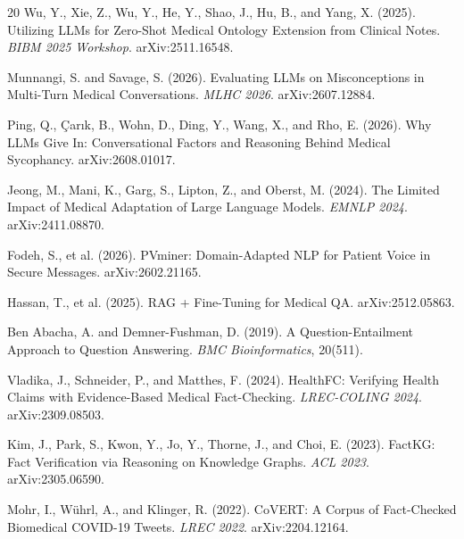 \documentclass[11pt,a4paper]{article}
\begin{document}
\begin{thebibliography}{20}
Wu, Y., Xie, Z., Wu, Y., He, Y., Shao, J., Hu, B., and Yang, X. (2025).
Utilizing LLMs for Zero-Shot Medical Ontology Extension from Clinical Notes.
\textit{BIBM 2025 Workshop}. arXiv:2511.16548.

Munnangi, S. and Savage, S. (2026).
Evaluating LLMs on Misconceptions in Multi-Turn Medical Conversations.
\textit{MLHC 2026}. arXiv:2607.12884.

Ping, Q., \c{C}ar{\i}k, B., Wohn, D., Ding, Y., Wang, X., and Rho, E. (2026).
Why LLMs Give In: Conversational Factors and Reasoning Behind Medical Sycophancy.
arXiv:2608.01017.

Jeong, M., Mani, K., Garg, S., Lipton, Z., and Oberst, M. (2024).
The Limited Impact of Medical Adaptation of Large Language Models.
\textit{EMNLP 2024}. arXiv:2411.08870.

Fodeh, S., et al. (2026).
PVminer: Domain-Adapted NLP for Patient Voice in Secure Messages.
arXiv:2602.21165.

Hassan, T., et al. (2025).
RAG + Fine-Tuning for Medical QA.
arXiv:2512.05863.

Ben Abacha, A. and Demner-Fushman, D. (2019).
A Question-Entailment Approach to Question Answering.
\textit{BMC Bioinformatics}, 20(511).

Vladika, J., Schneider, P., and Matthes, F. (2024).
HealthFC: Verifying Health Claims with Evidence-Based Medical Fact-Checking.
\textit{LREC-COLING 2024}. arXiv:2309.08503.

Kim, J., Park, S., Kwon, Y., Jo, Y., Thorne, J., and Choi, E. (2023).
FactKG: Fact Verification via Reasoning on Knowledge Graphs.
\textit{ACL 2023}. arXiv:2305.06590.

Mohr, I., W\"{u}hrl, A., and Klinger, R. (2022).
CoVERT: A Corpus of Fact-Checked Biomedical COVID-19 Tweets.
\textit{LREC 2022}. arXiv:2204.12164.

\end{thebibliography}
\end{document}
